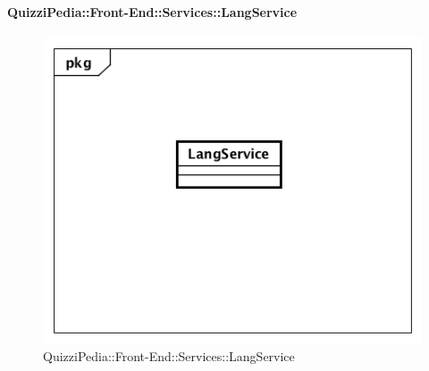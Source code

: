 \paragraph{QuizziPedia::Front-End::Services::LangService}
\begin{figure}
	\centering
	\includegraphics[scale=0.45]{UML/Classi/Front-End/QuizziPedia_Front-end_Services_ LangService.png}
	\caption{QuizziPedia::Front-End::Services::LangService}
\end{figure}
